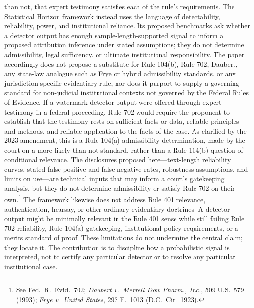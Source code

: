 \documentclass[11pt]{article}
\begin{document}
than not, that expert testimony satisfies each of the rule's requirements. The
Statistical Horizon framework instead uses the language of detectability, reliability,
power, and institutional reliance. Its proposed benchmarks ask whether a detector
output has enough sample-length-supported signal to inform a proposed attribution
inference under stated assumptions; they do not determine admissibility, legal
sufficiency, or ultimate institutional responsibility. The paper accordingly does not
propose a substitute for Rule 104(b), Rule 702, Daubert, any state-law analogue such
as Frye or hybrid admissibility standards, or any jurisdiction-specific evidentiary
rule, nor does it purport to supply a governing standard for non-judicial
institutional contexts not governed by the Federal Rules of Evidence.
If a watermark detector output were offered through expert testimony in a federal
proceeding, Rule 702 would require the proponent to establish that the testimony
rests on sufficient facts or data, reliable principles and methods, and reliable
application to the facts of the case. As clarified by the 2023 amendment, this is a
Rule 104(a) admissibility determination, made by the court on a more-likely-than-not
standard, rather than a Rule 104(b) question of conditional relevance. The
disclosures proposed here---text-length reliability curves, stated false-positive and
false-negative rates, robustness assumptions, and limits on use---are technical
inputs that may inform a court's gatekeeping analysis, but they do not determine
admissibility or satisfy Rule 702 on their own.\footnote{See Fed.\ R.\ Evid.\ 702;
\emph{Daubert v.\ Merrell Dow Pharm., Inc.}, 509 U.S.\ 579 (1993); \emph{Frye v.\
United States}, 293 F.\ 1013 (D.C.\ Cir.\ 1923).} The framework likewise does not
address Rule 401 relevance, authentication, hearsay, or other ordinary evidentiary
doctrines. A detector output might be minimally relevant in the Rule 401 sense while
still failing Rule 702 reliability, Rule 104(a) gatekeeping, institutional policy
requirements, or a merits standard of proof.
These limitations do not undermine the central claim; they locate it. The
contribution is to discipline how a probabilistic signal is interpreted, not to
certify any particular detector or to resolve any particular institutional case.
\end{document}
